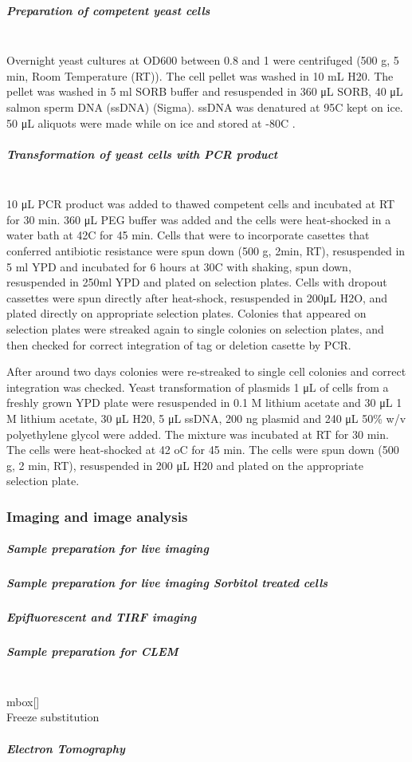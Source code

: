 \subparagraph{Preparation of competent yeast cells} 
\mbox{}\\
Overnight yeast cultures at OD600 between 0.8 and 1 were centrifuged (500 g, 5 min, Room Temperature (RT)). The cell
pellet was washed in 10 mL H20. The pellet was washed in 5 ml SORB buffer and resuspended in 360 μL SORB, 40 μL salmon sperm DNA (ssDNA) (Sigma). ssDNA was denatured at 95C kept on ice. 50 μL aliquots were made while on ice and stored at -80C .

\subparagraph{Transformation of yeast cells with PCR product} 
\mbox{}\\
10 μL PCR product was added to thawed competent cells and incubated at RT for 30 min. 360 μL PEG buffer was added and the cells were heat-shocked in a water bath at 42C for 45 min. Cells that were to incorporate casettes that conferred antibiotic resistance were spun down (500 g, 2min, RT), resuspended in 5 ml YPD and incubated for 6 hours at 30C with shaking, spun down, resuspended in 250ml YPD and plated on selection plates. Cells with dropout cassettes were spun directly after heat-shock, resuspended in 200μL H2O, and plated directly on appropriate selection plates. Colonies that appeared on selection plates were streaked again to single colonies on selection plates, and then checked for correct integration of tag or deletion casette by PCR.

After around two days colonies were re-streaked to single cell colonies and correct integration was checked.
Yeast transformation of plasmids
1 μL of cells from a freshly grown YPD plate were resuspended in 0.1 M lithium acetate and 30 μL 1 M lithium acetate, 30 μL H20, 5 μL ssDNA, 200 ng plasmid and 240 μL 50\% w/v polyethylene glycol were added. The mixture was incubated at RT for 30 min. The cells were heat-shocked at 42 oC for 45 min. The cells were spun down (500 g, 2 min, RT), resuspended in 200 μL H20 and plated on the appropriate selection plate.

\subsubsection{Imaging and image analysis }

\subparagraph{Sample preparation for live imaging}

\subparagraph{Sample preparation for live imaging Sorbitol treated cells}

\subparagraph{Epifluorescent and TIRF imaging}

\subparagraph{Sample preparation for CLEM}
\\mbox[]\\
\subsubitem
Freeze substitution

\subparagraph{Electron Tomography}



